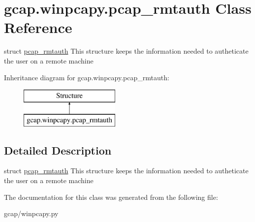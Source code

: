 \hypertarget{classgcap_1_1winpcapy_1_1pcap__rmtauth}{}\section{gcap.\+winpcapy.\+pcap\+\_\+rmtauth Class Reference}
\label{classgcap_1_1winpcapy_1_1pcap__rmtauth}


struct \hyperlink{classgcap_1_1winpcapy_1_1pcap__rmtauth}{pcap\+\_\+rmtauth} This structure keeps the information needed to autheticate the user on a remote machine  


Inheritance diagram for gcap.\+winpcapy.\+pcap\+\_\+rmtauth\+:\begin{figure}[H]
\begin{center}
\leavevmode
\includegraphics[height=2.000000cm]{da/d8f/classgcap_1_1winpcapy_1_1pcap__rmtauth}
\end{center}
\end{figure}


\subsection{Detailed Description}
struct \hyperlink{classgcap_1_1winpcapy_1_1pcap__rmtauth}{pcap\+\_\+rmtauth} This structure keeps the information needed to autheticate the user on a remote machine 

The documentation for this class was generated from the following file\+:\begin{DoxyCompactItemize}
\item 
gcap/winpcapy.\+py\end{DoxyCompactItemize}
